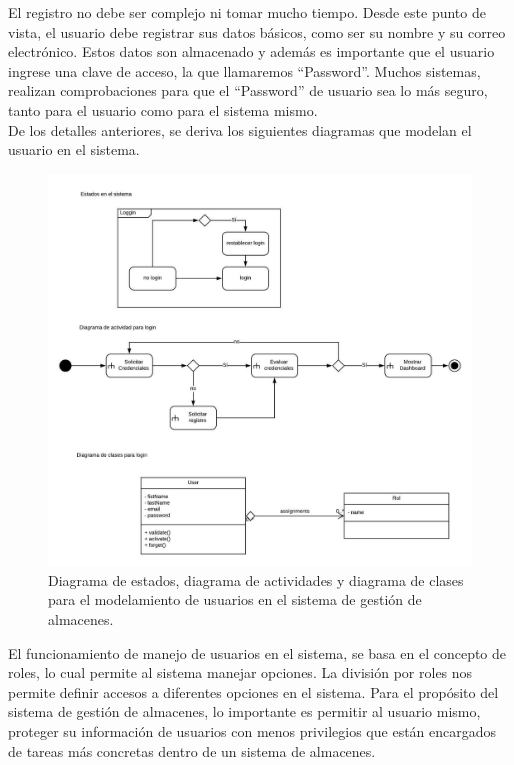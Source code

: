 El registro no debe ser complejo ni tomar mucho tiempo. Desde este punto de vista, el usuario debe registrar sus datos básicos, como ser su nombre y su correo electrónico. Estos datos son almacenado y además es importante que el usuario ingrese una clave de acceso, la que llamaremos “Password”. Muchos sistemas, realizan comprobaciones para que el “Password” de usuario sea lo más seguro, tanto para el usuario como para el sistema mismo.\\

De los detalles anteriores, se deriva los siguientes diagramas que modelan el usuario en el sistema.

\begin{figure}
  \centering
    \includegraphics[scale=0.7]{./Capitulo3/figs/ADDStock-user-login.jpeg}
  \caption{Diagrama de estados, diagrama de actividades y diagrama de clases para el modelamiento de usuarios en el sistema de gestión de almacenes.}
  \label{user_login}
\end{figure}

El funcionamiento de manejo de usuarios en el sistema, se basa en el concepto de roles, lo cual permite al sistema manejar opciones. La división por roles nos permite definir accesos a diferentes opciones en el sistema. Para el propósito del sistema de gestión de almacenes, lo importante es permitir al usuario mismo, proteger su información de usuarios con menos privilegios que están encargados de tareas más concretas dentro de un sistema de almacenes.\\

